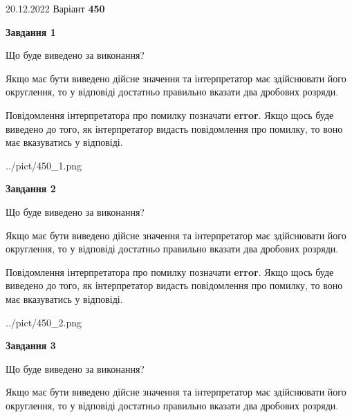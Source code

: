\documentclass[12pt, ukrainian]{article}
\begin{document}
{20.12.2022 Варіант \No \textbf { 450 }\par}
{
\begin {Large}

{\begin {center}\textbf{Завдання 1}\end {center}}\par
Що буде виведено за виконання? \par

Якщо має бути виведено дійсне значення та інтерпретатор має здійснювати його округлення, 
то у відповіді достатньо правильно вказати два дробових розряди.

Повідомлення інтерпретатора про помилку позначати \textbf{error}.
Якщо щось буде виведено до того, як інтерпретатор видасть повідомлення про помилку, 
то воно має вказуватись у відповіді. \par

\begin{center}
	{../pict/450_1.png}
\end{center}
\newpage

{\begin {center}\textbf{Завдання 2}\end {center}}\par
Що буде виведено за виконання? \par

Якщо має бути виведено дійсне значення та інтерпретатор має здійснювати його округлення, 
то у відповіді достатньо правильно вказати два дробових розряди.

Повідомлення інтерпретатора про помилку позначати \textbf{error}.
Якщо щось буде виведено до того, як інтерпретатор видасть повідомлення про помилку, 
то воно має вказуватись у відповіді. \par

\begin{center}
	{../pict/450_2.png}
\end{center}
\newpage

{\begin {center}\textbf{Завдання 3}\end {center}}\par
Що буде виведено за виконання? \par

Якщо має бути виведено дійсне значення та інтерпретатор має здійснювати його округлення, 
то у відповіді достатньо правильно вказати два дробових розряди.


\end{Large}}
\end{document}
